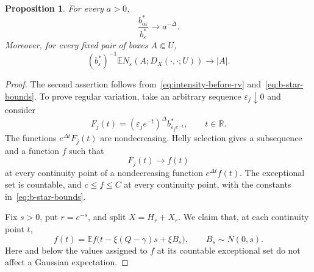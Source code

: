 \documentclass[11pt,letterpaper]{article}
\newcommand{\R}{\mathbb R}
\newcommand{\E}{\mathbb E}
\newcommand{\eps}{\varepsilon}
\newtheorem{proposition}[theorem]{Proposition}
\theoremstyle{definition}
\theoremstyle{remark}
\numberwithin{equation}{section}
\begin{document}
\begin{proposition}\label{prop:regular-variation}
For every $a>0$,
\begin{equation}\label{eq:regular-variation}
 \frac{b_{a\eps}^*}{b_\eps^*}\longrightarrow a^{-\Delta}.
\end{equation}
Moreover, for every fixed pair of boxes $A\Subset U$,
\begin{equation}\label{eq:normalized-intensity}
 (b_\eps^*)^{-1}
   \E N_\eps(A;D_X(\cdot,\cdot;U))\longrightarrow |A|.
\end{equation}
\end{proposition}

\begin{proof}
The second assertion follows from~\eqref{eq:intensity-before-rv} and~\eqref{eq:b-star-bounds}. To prove regular variation, take an arbitrary sequence $\eps_j\downarrow0$ and consider
\begin{equation*}
 F_j(t)=(\eps_j e^{-t})^\Delta b_{\eps_j e^{-t}}^*,\qquad t\in\R.
\end{equation*}
The functions $e^{\Delta t}F_j(t)$ are nondecreasing. Helly selection gives a subsequence and a function $f$ such that
\begin{equation}\label{eq:helly}
 F_j(t)\longrightarrow f(t)
\end{equation}
at every continuity point of a nondecreasing function $e^{\Delta t}f(t)$. The exceptional set is countable, and $c\le f\le C$ at every continuity point, with the constants in~\eqref{eq:b-star-bounds}.

Fix $s>0$, put $r=e^{-s}$, and split $X=H_r+X_r$. We claim that, at each continuity point $t$,
\begin{equation}\label{eq:harmonic-profile}
 f(t)=\E f\bigl(t-\xi(Q-\gamma)s+\xi B_s\bigr),
 \qquad B_s\sim N(0,s).
\end{equation}
Here and below the values assigned to $f$ at its countable exceptional set do not affect a Gaussian expectation.


\end{proof}
\end{document}
